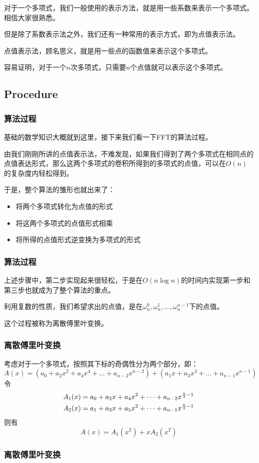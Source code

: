 \documentclass[10pt]{beamer}
\begin{document}
\begin{spacing}{1.2}
\begin{frame}
			对于一个多项式，我们一般使用的表示方法，就是用一些系数来表示一个多项式。相信大家很熟悉。 \pause

			但是除了系数表示法之外，我们还有一种常用的表示方式，即为点值表示法。 \pause

			点值表示法，顾名思义，就是用一些点的函数值来表示这个多项式。 \pause

			容易证明，对于一个$n$次多项式，只需要$n$个点值就可以表示这个多项式。

		\end{frame}

		\subsection{Procedure}

		\begin{frame}
			\frametitle{算法过程}

			基础的数学知识大概就到这里，接下来我们看一下FFT的算法过程。 \pause

			由我们刚刚所讲的点值表示法，不难发现，如果我们得到了两个多项式在相同点的点值表达形式，那么这两个多项式的卷积所得到的多项式的点值，可以在$O(n)$的复杂度内轻松得到。 \pause

			于是，整个算法的雏形也就出来了： \pause
			\begin{itemize}
				\item 将两个多项式转化为点值的形式
				\item 将这两个多项式的点值形式相乘
				\item 将所得的点值形式逆变换为多项式的形式
			\end{itemize}

		\end{frame}

		\begin{frame}
			\frametitle{算法过程}

			上述步骤中，第二步实现起来很轻松，于是在$O(n\log n)$的时间内实现第一步和第三步也就成为了整个算法的重点。 \pause

			利用复数的性质，我们希望求出的点值，是在$\omega_n^0, \omega_n^1, ..., \omega_n^{n - 1}$下的点值。\pause

			这个过程被称为离散傅里叶变换。

		\end{frame}

		\begin{frame}
			\frametitle{离散傅里叶变换}

			考虑对于一个多项式，按照其下标的奇偶性分为两个部分，即：
			$$A(x)=(a_0 + a_2x^2 + a_4x^4 + \dots + a_{n-2}x^{n-2})+(a_1x + a_3x^3 + \dots + a_{n-1}x^{n-1})$$ \pause
			令
			\begin{align}
				A_1(x) &= a_0 + a_2x + a_4x^2 + \dots + a_{n-2}x^{\frac{n}{2}-1} \notag \\ A_2(x) &= a_1 + a_3x + a_5x^2 + \dots + a_{n-1}x^{\frac{n}{2}-1} \notag
			\end{align} \pause
			则有
			$$A(x)=A_1(x^2)+xA_2(x^2)$$
		\end{frame}
		\begin{frame}
			\frametitle{离散傅里叶变换}


\end{frame}
\end{spacing}
\end{document}
